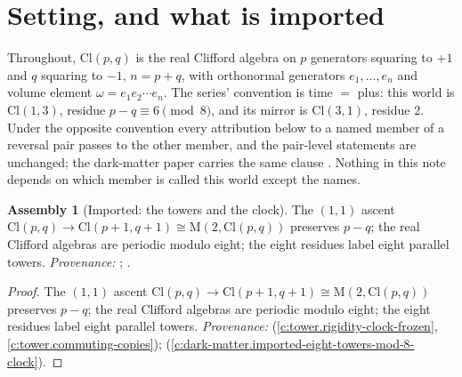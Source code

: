\documentclass[11pt]{article}
\theoremstyle{definition}
\newtheorem{assembled}[theorem]{Assembly}
\theoremstyle{plain}
\providecommand{\Cl}{}\renewcommand{\Cl}{\mathrm{Cl}}
\providecommand{\Mat}{}\renewcommand{\Mat}{\mathrm{M}}
\begin{document}
\noindent{}
\newpage

\section{Setting, and what is imported}

\label{c:note.odd-extensions.setting-setting-what-imported}
Throughout, $\Cl(p,q)$ is the real Clifford algebra on $p$ generators squaring to $+1$ and $q$ squaring to $-1$, $n = p + q$, with orthonormal generators $e_{1}, \ldots, e_{n}$ and volume element $\omega = e_{1}e_{2}\cdots e_{n}$. The series' convention is time $= $ plus: this world is $\Cl(1,3)$, residue $p - q \equiv 6 \pmod 8$, and its mirror is $\Cl(3,1)$, residue $2$. Under the opposite convention every attribution below to a named member of a reversal pair passes to the other member, and the pair-level statements are unchanged; the dark-matter paper carries the same clause \cite[Thm.~3.4]{ButlerT14}. Nothing in this note depends on which member is called this world except the names.

\begin{assembled}[Imported: the towers and the clock]\label{c:odd-extensions.imported-towers-clock}
The $(1,1)$ ascent $\Cl(p,q) \to \Cl(p+1,q+1) \cong \Mat(2, \Cl(p,q))$ preserves $p - q$; the real Clifford algebras are periodic modulo eight; the eight residues label eight parallel towers. \emph{Provenance:} \cite[Thms.~3.2 and 3.6]{ButlerT3}; \cite[Fact~2.5]{ButlerT14}.
\end{assembled}
\begin{proof}
The $(1,1)$ ascent $\Cl(p,q) \to \Cl(p+1,q+1) \cong \Mat(2, \Cl(p,q))$ preserves $p - q$; the real Clifford algebras are periodic modulo eight; the eight residues label eight parallel towers. \emph{Provenance:} \cite[Thms.~3.2 and 3.6]{ButlerT3} (\ref{c:tower.rigidity-clock-frozen}, \ref{c:tower.commuting-copies}); \cite[Fact~2.5]{ButlerT14} (\ref{c:dark-matter.imported-eight-towers-mod-8-clock}).

\end{proof}
\end{document}
